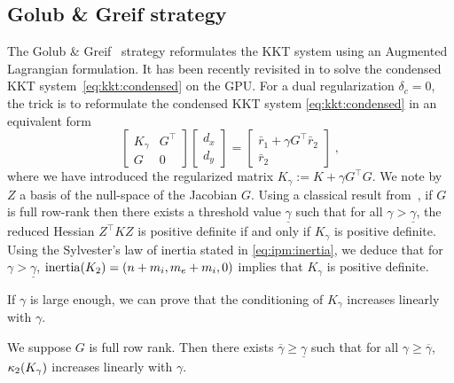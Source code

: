 \subsection{Golub \& Greif strategy}
\label{sec:kkt:golubgreif}
The Golub \& Greif~\cite{golub2003solving} strategy reformulates the KKT system
using an Augmented Lagrangian formulation.
It has been recently revisited in \cite{regev2023hykkt}
to solve the condensed KKT system~\eqref{eq:kkt:condensed} on the GPU.
For a dual regularization $\delta_c = 0$,
the trick is to reformulate the condensed KKT system \eqref{eq:kkt:condensed} in an equivalent form
\begin{equation}
  \label{eq:kkt:hykkt}
  \begin{bmatrix}
    K_\gamma & G^\top \\
    G & 0
  \end{bmatrix}
  \begin{bmatrix}
    d_x \\ d_y
  \end{bmatrix}
  =
  \begin{bmatrix}
    \bar{r}_1 + \gamma G^\top \bar{r}_2 \\
    \bar{r}_2
  \end{bmatrix} \; ,
\end{equation}
where we have introduced the regularized matrix $K_\gamma := K + \gamma G^\top G$.
We note by $Z$ a basis of the null-space of the Jacobian $G$.
Using a classical result from~\cite{debreu1952definite},
if $G$ is full row-rank then there
exists a threshold value $\underline{\gamma}$ such that
for all $\gamma > \underline{\gamma}$, the reduced Hessian $Z^\top K Z$
is positive definite if and only if $K_\gamma$ is positive definite.
Using the Sylvester's law of inertia stated in \eqref{eq:ipm:inertia}, we deduce
that for $\gamma > \underline{\gamma}$, $\operatorname{inertia}(K_2) = (n + m_i, m_e +m_i, 0)$
implies that $K_\gamma$ is positive definite.

If $\gamma$ is large enough, we can prove that the conditioning
of $K_\gamma$ increases linearly with $\gamma$.
\begin{proposition}
  \label{prop:kkt:hykkt:cond}
  We suppose $G$ is full row rank. Then there exists $\overline{\gamma}
  \geq \underline{\gamma}$ such that for all $\gamma \geq \overline{\gamma}$,
  $\kappa_2(K_\gamma)$ increases linearly with $\gamma$.
\end{proposition}

